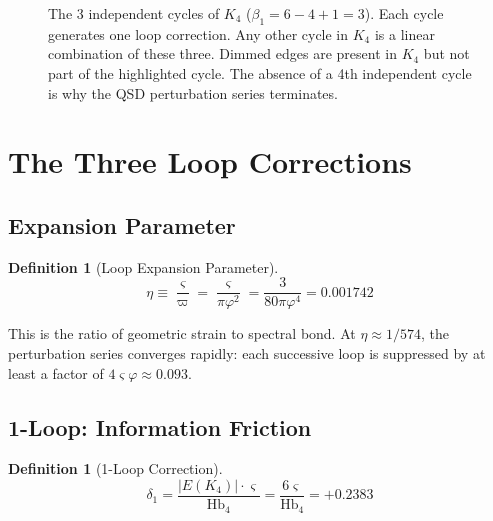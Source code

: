 \documentclass[11pt,a4paper]{article}
\theoremstyle{definition}
\newtheorem{definition}[theorem]{Definition}
\newcommand{\Hbfour}{\mathrm{Hb}_4}
\newcommand{\gs}{\varsigma}
\begin{document}
\begin{figure}[h]
\caption{The 3 independent cycles of $K_4$ ($\beta_1 = 6 - 4 + 1 = 3$). Each cycle generates one loop correction. Any other cycle in $K_4$ is a linear combination of these three. Dimmed edges are present in $K_4$ but not part of the highlighted cycle. The absence of a 4th independent cycle is why the QSD perturbation series terminates.}
\label{fig:cycles}
\end{figure}

\section{The Three Loop Corrections}
\label{sec:loops}

\subsection{Expansion Parameter}

\begin{definition}[Loop Expansion Parameter]
\begin{equation}
\eta \equiv \frac{\gs}{\varpi} = \frac{\gs}{\pi\varphi^2} = \frac{3}{80\pi\varphi^4} = 0.001742
\label{eq:eta}
\end{equation}
\end{definition}

This is the ratio of geometric strain to spectral bond. At $\eta \approx 1/574$, the perturbation series converges rapidly: each successive loop is suppressed by at least a factor of $4\gs\varphi \approx 0.093$.

\subsection{1-Loop: Information Friction}

\begin{definition}[1-Loop Correction]
\begin{equation}
\delta_1 = \frac{|E(K_4)| \cdot \gs}{\Hbfour} = \frac{6\gs}{\Hbfour} = +0.2383
\label{eq:loop1}
\end{equation}
\end{definition}
\end{document}
